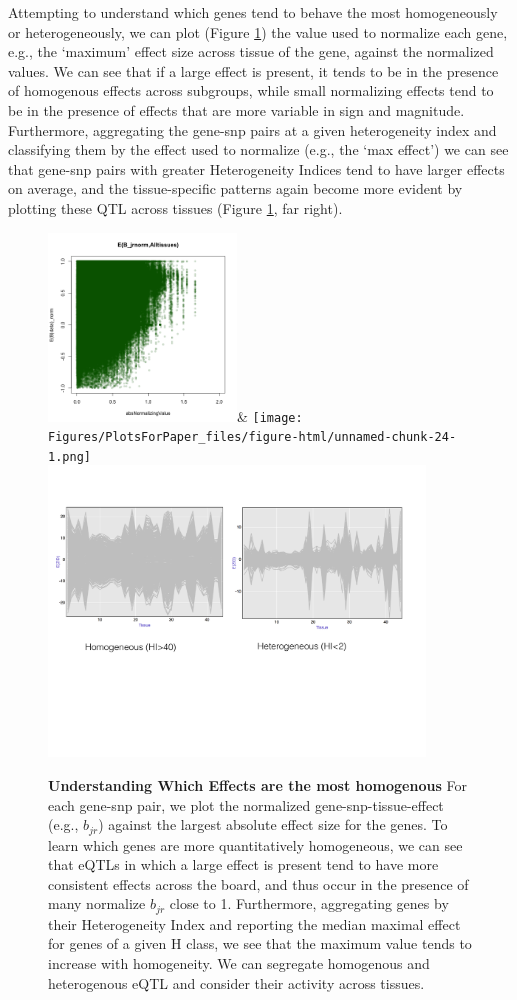 Attempting to understand which genes tend to behave the most homogeneously or heterogeneously, we can plot (Figure \ref{fig:biplot}) the value used to normalize each gene, e.g., the `maximum' effect size across tissue of the gene, against the normalized values. We can see that if a large effect is present, it tends to be in the presence of homogenous effects across subgroups, while small normalizing effects tend to be in the presence of effects that are more variable in sign and magnitude. Furthermore, aggregating the gene-snp pairs at a given heterogeneity index and classifying them by the effect used to normalize (e.g., the `max effect') we can see that gene-snp pairs with greater Heterogeneity Indices tend to have larger effects on average, and the tissue-specific patterns again become more evident by plotting these QTL across tissues (Figure \ref{fig:biplot}, far right).
\begin{figure}[htbp]
\includegraphics[width=5cm]{Figures/normstuffeb_alltissues.png}&
\texttt{[image: Figures/PlotsForPaper\_files/figure-html/unnamed-chunk-24-1.png]}\\
\includegraphics[width=10cm]{Figures/hetvshomqtl.pdf}
\caption{\textbf{Understanding Which Effects are the most homogenous} For each gene-snp pair, we plot the normalized gene-snp-tissue-effect (e.g., $b_{jr}$) against the largest absolute effect size for the genes. To learn which genes are more quantitatively homogeneous, we can see that eQTLs in which a large effect is present tend to have more consistent effects across the board, and thus occur in the presence of many normalize $b_{jr}$ close to 1. Furthermore, aggregating genes by their Heterogeneity Index and reporting the median maximal effect for genes of a given H class, we see that the maximum value tends to increase with homogeneity. We can segregate homogenous and heterogenous eQTL and consider their activity across tissues.}
\label{fig:biplot}
\end{figure}

